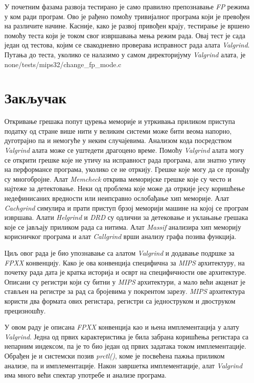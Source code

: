 \documentclass[12pt,oneside]{memoir}
\begin{document}
\indent У почетним фазама развоја тестирано је само правилно препознавање \textit{FP} режима у ком ради програм. Ово је рађено помоћу тривијалног програма који је превођен на различите начине. Касније, како је развој привођен крају, тестирање је вршено помоћу теста који је током свог извршавања мења режим рада. Овај тест је сада један од тестова, којим се свакодневно проверава исправност рада алата \textit{Valgrind}. Путања до теста, уколико се налазимо у самом директоријуму \textit{Valgrind} алата, је none/tests/mips32/change\_fp\_mode.c



\chapter{Закључак}

\indent Откривање грешака попут цурења меморије и утркивања приликом приступа податку од стране више нити у великим системи може бити веома напорно, дуготрајно па и немогуће у неким случајевима. Анализом кода посредством \textit{Valgrind} алата може се уштедети драгоцено време. Помоћу \textit{Valgrind} алата могу се открити грешке које не утичу на исправност рада програма, али знатно утичу на перформансе програма, уколико се не отркију. Грешке које могу да се пронађу су многобројне. Алат \textit{Memcheck} открива меморијске грешке које су често и најтеже за детектовање. Неки од проблема које може да отркије јесу коришћење недефинисаних вредности или неипсравно ослобађање хип меморије. Алат \textit{Cachgrind} симулира и прати приступ брзој меморији машине на којој се програм  извршава. Алати \textit{Helgrind} и \textit{DRD} су одлични за детековање и уклањање грешака које се јављају приликом рада са нитима. Алат \textit{Massif} анализира хип меморију корисничког програма и алат \textit{Callgrind} врши анализу графа позива функција.

\indent Циљ овог рада је био упознавање са алатом \textit{Valgrind} и додавање подршке за \textit{FPXX} конвенцију. Како је ова конвенција специфична за \textit{MIPS} архитектуру, на почетку рада дата је кратка историја и осврт на специфичности ове архитектуре. Описани су регистри који су битни у \textit{MIPS} архитектури, а мало већи акценат је стављен на регистре за рад са бројевима у покрентом зарезу. \textit{MIPS} архитектура користи два формата ових регистара, регистри са једноструком и двоструком прецизношћу.

\indent У овом раду је описана \textit{FPXX} конвенција као и њена имплементација у алату \textit{Valgrind}. Једна од првих карактеристика је била забрана коришћења регистара са непарним индексом, па је то био један од првих задатака током имплементације. Обрађен је и системски позив \textit{prctl()}, коме је посвећена пажња приликом анализе, па и имплементације. Након завршетка имплементације, алат \textit{Valgrind} има много већи спектар употребе и анализе програма.
\end{document}
